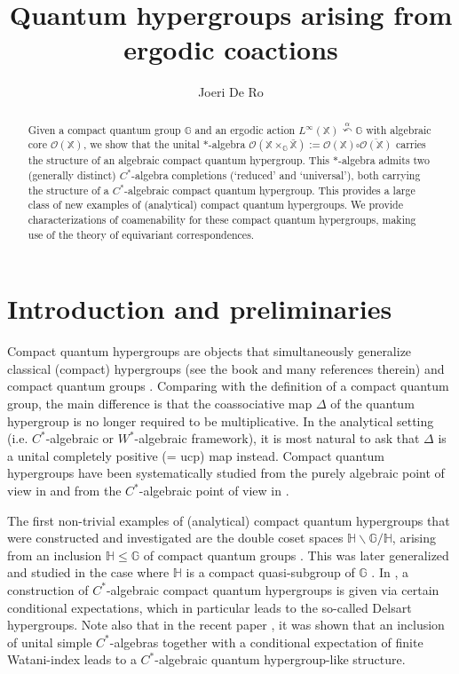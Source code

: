 \documentclass[reqno]{amsart}
\numberwithin{equation}{section}
\newcommand\XGX{\X\times_\G \bar{\X}}
\renewcommand{\H}{\mathbb{H}}
\newcommand{\mcO}{\mathcal{O}}
\newcommand{\G}{\mathbb{G}}
\newcommand{\X}{\mathbb{X}}
\begin{document}
\title{Quantum hypergroups arising from ergodic coactions}
\author{Joeri De Ro}
\address{Institute of Mathematics of the Polish Academy of Sciences}

\begin{abstract} 
    Given a compact quantum group $\G$ and an ergodic action $ L^\infty(\X)\stackrel{\alpha}\curvearrowleft \G$ with algebraic core $\mcO(\X)$, we show that the unital $*$-algebra $\mcO(\XGX):= \mcO(\X)\square\overline{\mcO(\X)}$ carries the structure of an algebraic compact quantum hypergroup. This $*$-algebra admits two (generally distinct) $C^*$-algebra completions (`reduced' and `universal'), both carrying the structure of a $C^*$-algebraic compact quantum hypergroup. This provides a large class of new examples of (analytical) compact quantum hypergroups. We provide characterizations of coamenability for these compact quantum hypergroups, making use of the theory of equivariant correspondences.
\end{abstract}

\maketitle

\section{Introduction and preliminaries}

Compact quantum hypergroups are objects that simultaneously generalize classical (compact) hypergroups (see the book \cite{HB95} and many references therein) and compact quantum groups \cites{Wor87a, Wor87b, Wor98}. Comparing with the definition of a compact quantum group, the main difference is that the coassociative map $\Delta$ of the quantum hypergroup is no longer required to be multiplicative. In the analytical setting (i.e. $C^*$-algebraic or $W^*$-algebraic framework), it is most natural to ask that $\Delta$ is a unital completely positive (= ucp) map instead. Compact quantum hypergroups have been systematically studied from the purely algebraic point of view in \cites{DVD11a, DVD11b} and from the $C^*$-algebraic point of view in \cite{CV99}.

The first non-trivial examples of (analytical) compact quantum hypergroups that were constructed and investigated are the double coset spaces $\H\backslash \G/\H$, arising from an inclusion $\H\le \G$ of compact quantum groups \cites{CV92, Vai95a, Vai95b, PV99, CV99, FS00}. This was later generalized and studied in the case where $\H$ is a compact quasi-subgroup \cite{KS20} of $\G$ \cites{FS09, Zh20,DFW21}. In \cite{Ka01}, a construction of $C^*$-algebraic compact quantum hypergroups is given via certain conditional expectations, which in particular leads to the so-called Delsart hypergroups.
Note also that in the recent paper \cite{BGP26}, it was shown that an inclusion of unital simple $C^*$-algebras together with a conditional expectation of finite Watani-index leads to a $C^*$-algebraic quantum hypergroup-like structure.
\end{document}
